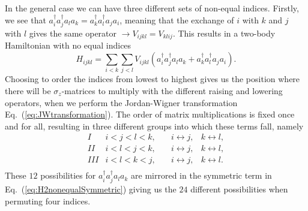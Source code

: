 \documentclass[aps,pra,twocolumn,floatfix]{revtex4}
\begin{document}
In the general case we can have three different sets of non-equal
indices. Firstly, we see that $a^\dag_i a^\dag_j a_l a_k = a^\dag_k
a^\dag_l a_j a_i$, meaning that the  exchange of $i$ with $k$ and $j$ with $l$
gives the same operator $\rightarrow V_{ijkl}=V_{klij}$. This results in 
a two-body Hamiltonian with no equal indices
\begin{equation}
\label{eq:H2nonequalSymmetric}
H_{ijkl} = 
\sum_{i < k}\sum_{ j < l} V_{ijkl} (a_i^\dag a_j^\dag a_l a_k + a_k^\dag
a_l^\dag a_j a_i).
\end{equation} 
Choosing to order the 
indices from lowest to highest gives us  the position 
where there will be $\sigma_z$-matrices to multiply with the
different raising and lowering operators, when we perform the
Jordan-Wigner transformation Eq.~(\ref{eq:JWtransformation}). The
order of matrix 
multiplications is fixed once and for all, resulting in  three
different groups into which these terms fall, namely
\begin{equation}
\label{eq:threeGroups}
\begin{array}{ccccc}
I & i<j<l<k, & i \leftrightarrow j, &  k\leftrightarrow l, \\
II & i<l<j<k, \quad& i \leftrightarrow j, &  k\leftrightarrow l, \\
III & i<l<k<j, \quad& i \leftrightarrow j, &  k\leftrightarrow l. \\
\end{array} 
\end{equation}
These $12$ possibilities for $a^\dag_i a^\dag_j a_l a_k$ 
are mirrored in the symmetric term
in Eq.~(\ref{eq:H2nonequalSymmetric}) giving us the $24$ different
possibilities when permuting four indices.
\end{document}
